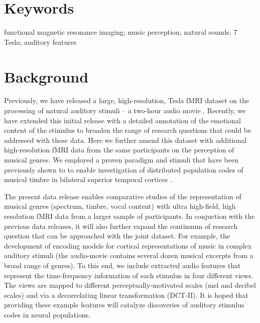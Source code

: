 \documentclass[10pt,a4paper,twocolumn]{article}
\begin{document}
\section*{Keywords}
functional magnetic resonance imaging; music perception; natural sounds;
7 Tesla; auditory features

\clearpage

\section*{Background}


Previously, we have released a large, high-resolution, \unit[7]{Tesla} fMRI
dataset on the processing of natural auditory stimuli -- a two-hour audio movie
\cite{HBI+14}.  Recently, we have extended this initial release with a detailed
annotation of the emotional content of the stimulus \cite{LRS+2015} to broaden
the range of research questions that could be addressed with these data.  Here
we further amend this dataset with additional high-resolution fMRI data from
the same participants on the perception of musical genres.  We employed a
proven paradigm and stimuli that have been previously shown to to enable
investigation of distributed population codes of musical timbre in bilateral
superior temporal cortices \cite{CTK+2012}. 

The present data release enables comparative studies of the representation of
musical genres (spectrum, timbre, vocal content) with ultra high-field, high
resolution fMRI data from a larger sample of participants. In conjuction with
the previous data releases, it will also further expand the continuum of
research question that can be approached with the joint dataset. For example,
the development of encoding models for cortical representations of music in
complex auditory stimuli (the audio-movie contains several dozen musical
excerpts from a broad range of genres). To this end, we include extracted audio
features that represent the time-frequency information of each stimulus in
four different views. The views are mapped to different perceptually-motivated
scales (mel and decibel scales) and via a decorrelating linear transformation
(DCT-II). It is hoped that providing these example features will catalyze
discoveries of auditory stimulus codes in neural populations.
\end{document}

